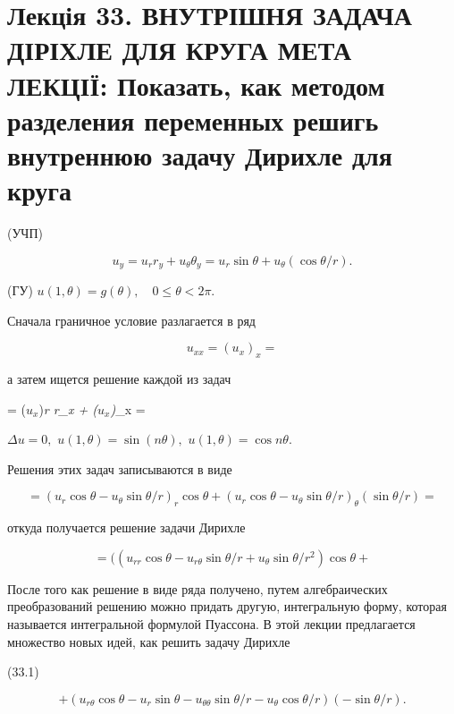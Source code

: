 \documentclass[
  ukrainian,
]{article}
\begin{document}
\section{Лекція 33. ВНУТРІШНЯ ЗАДАЧА ДІРІХЛЕ ДЛЯ КРУГА МЕТА ЛЕКЦІЇ:
Показать, как методом разделения переменных решигь внутреннюю задачу
Дирихле для
круга}\label{ux43bux435ux43aux446ux456ux44f-33.-ux432ux43dux443ux442ux440ux456ux448ux43dux44f-ux437ux430ux434ux430ux447ux430-ux434ux456ux440ux456ux445ux43bux435-ux434ux43bux44f-ux43aux440ux443ux433ux430-ux43cux435ux442ux430-ux43bux435ux43aux446ux456ux457-ux43fux43eux43aux430ux437ux430ux442ux44c-ux43aux430ux43a-ux43cux435ux442ux43eux434ux43eux43c-ux440ux430ux437ux434ux435ux43bux435ux43dux438ux44f-ux43fux435ux440ux435ux43cux435ux43dux43dux44bux445-ux440ux435ux448ux438ux433ux44c-ux432ux43dux443ux442ux440ux435ux43dux43dux44eux44e-ux437ux430ux434ux430ux447ux443-ux434ux438ux440ux438ux445ux43bux435-ux434ux43bux44f-ux43aux440ux443ux433ux430}

(УЧП)

\[
u_y = u_r r_y + u_\theta \theta_y = u_r \sin \theta + u_\theta (\cos \theta/r).
\]

(ГУ) \(u(1, \theta) = g(\theta), \quad 0 \le \theta < 2\pi.\)

Сначала граничное условие разлагается в ряд

\[
u_{xx} = (u_x)_x =
\]

а затем ищется решение каждой из задач

= (\(u_x\))\emph{r r\_x + (\(u_x\))}\theta \theta\_x =

\(\Delta u = 0,\) \(u(1, \theta) = \sin(n\theta),\)
\(u(1, \theta) = \cos n\theta.\)

Решения этих задач записываются в виде

\[
= (u_r \cos \theta - u_\theta \sin \theta/r)_r \cos \theta + (u_r \cos \theta - u_\theta \sin \theta/r)_\theta (\sin \theta/r) =
\]

откуда получается решение задачи Дирихле

\[
= ((u_{rr} \cos \theta - u_{r\theta} \sin \theta/r + u_\theta \sin \theta/r^2) \cos \theta +
\]

После того как решение в виде ряда получено, путем алгебраических
преобразований решению можно придать другую, интегральную форму, которая
называется интегральной формулой Пуассона. В этой лекции предлагается
множество новых идей, как решить задачу Дирихле

(33.1)

\[
+ (u_{r\theta} \cos \theta - u_r \sin \theta - u_{\theta\theta} \sin \theta/r - u_\theta \cos \theta/r) (-\sin \theta/r).
\]
\end{document}
